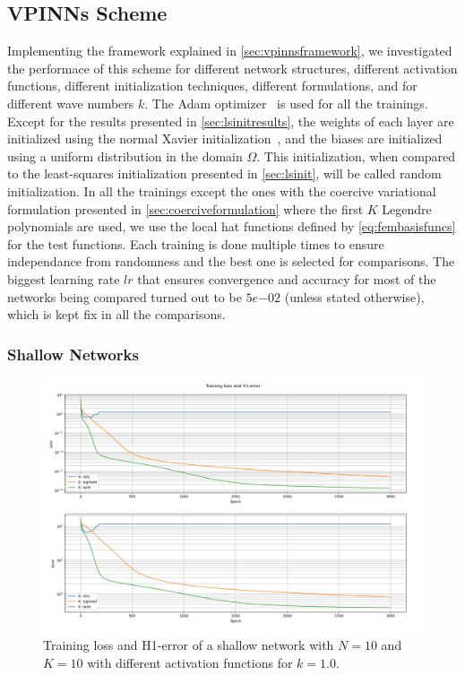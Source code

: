 \subsection{VPINNs Scheme}\label{sec:vpinnsresults}
Implementing the framework explained in \autoref{sec:vpinnsframework}, we investigated the performace of this scheme for different network structures, different activation functions, different initialization techniques, different formulations, and for different wave numbers $k$. The Adam optimizer~\cite{adamoptimizer} is used for all the trainings. Except for the results presented in \autoref{sec:lsinitresults}, the weights of each layer are initialized using the normal Xavier initialization~\cite{xavierinitialization}, and the biases are initialized using a uniform distribution in the domain $\Omega$. This initialization, when compared to the least-squares initialization presented in \autoref{sec:lsinit}, will be called random initialization. In all the trainings except the ones with the coercive variational formulation presented in \autoref{sec:coerciveformulation} where the first $K$ Legendre polynomials are used, we use the local hat functions defined by \autoref{eq:fembasisfuncs} for the test functions. Each training is done multiple times to ensure independance from randomness and the best one is selected for comparisons. The biggest learning rate $lr$ that ensures convergence and accuracy for most of the networks being compared turned out to be $5e{-02}$ (unless stated otherwise), which is kept fix in all the comparisons.

\subsubsection{Shallow Networks} \label{sec:vpinnsshallowresults}

\begin{figure}[h!]
    \centering
    \includegraphics[width=.7\textwidth]{img/VPINN-Comparison-Activation.png}
    \caption{Training loss and H1-error of a shallow network with $N=10$ and $K=10$ with different activation functions for $k=1.0$.}
    \label{fig:activationfunctions}
\end{figure}

